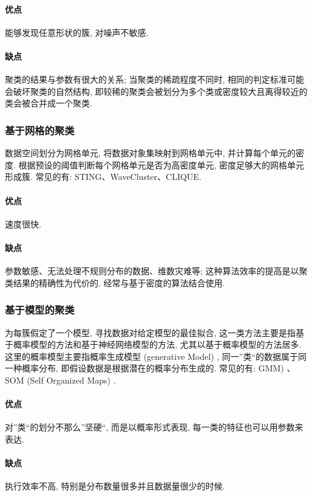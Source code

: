 \paragraph{优点}能够发现任意形状的簇, 对噪声不敏感. 

\paragraph{缺点}聚类的结果与参数有很大的关系; 当聚类的稀疏程度不同时, 相同的判定标准可能会破坏聚类的自然结构, 即较稀的聚类会被划分为多个类或密度较大且离得较近的类会被合并成一个聚类. 
	
\subsubsection{基于网格的聚类}
数据空间划分为网格单元, 将数据对象集映射到网格单元中, 并计算每个单元的密度. 根据预设的阈值判断每个网格单元是否为高密度单元, 密度足够大的网格单元形成簇. 常见的有: STING、WaveCluster、CLIQUE. 

\paragraph{优点}速度很快. 

\paragraph{缺点}参数敏感、无法处理不规则分布的数据、维数灾难等; 这种算法效率的提高是以聚类结果的精确性为代价的. 经常与基于密度的算法结合使用. 
	
\subsubsection{基于模型的聚类}
为每簇假定了一个模型, 寻找数据对给定模型的最佳拟合, 这一类方法主要是指基于概率模型的方法和基于神经网络模型的方法, 尤其以基于概率模型的方法居多. 这里的概率模型主要指概率生成模型 (generative Model) , 同一”类“的数据属于同一种概率分布, 即假设数据是根据潜在的概率分布生成的. 常见的有: GMM) 、SOM (Self Organized Maps) . 

\paragraph{优点}对”类“的划分不那么”坚硬“, 而是以概率形式表现, 每一类的特征也可以用参数来表达. 

\paragraph{缺点}执行效率不高, 特别是分布数量很多并且数据量很少的时候. 

